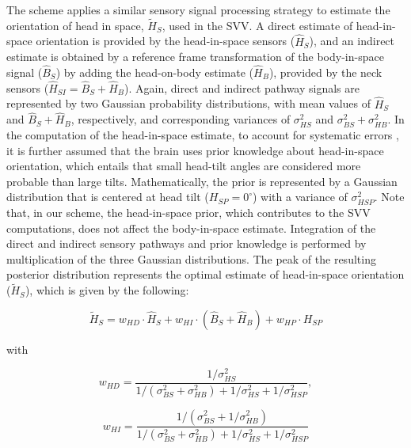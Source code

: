 The scheme applies a similar sensory signal processing strategy to estimate the orientation of head in space, $\tilde{H}_S$, used in the SVV. A direct estimate of head-in-space orientation is provided by the head-in-space sensors ($\hat{H}_S$), and an indirect estimate is obtained by a reference frame transformation of the body-in-space signal ($\hat{B}_S$) by adding the head-on-body estimate ($\hat{H}_B$), provided by the neck sensors ($\hat{H}_{SI} = \hat{B}_S + \hat{H}_B$). Again, direct and indirect pathway signals are represented by two Gaussian probability distributions, with mean values of $\hat{H}_S$ and $\hat{B}_S + \hat{H}_B$, respectively, and corresponding variances of $\sigma^2_{HS}$ and $\sigma^2_{BS} + \sigma^2_{HB}$. In the computation of the head-in-space estimate, to account for systematic errors \cite{macneilage2007, devrijer2008}, it is further assumed that the brain uses prior knowledge about head-in-space orientation, which entails that small head-tilt angles are considered more probable than large tilts. Mathematically, the prior is represented by a Gaussian distribution that is centered at  head tilt ($H_{SP} = 0^\circ$) with a variance of $\sigma^2_{HSP}$. Note that, in our scheme, the head-in-space prior, which contributes to the SVV computations, does not affect the body-in-space estimate. Integration of the direct and indirect sensory pathways and prior knowledge is performed by multiplication of the three Gaussian distributions. The peak of the resulting posterior distribution represents the optimal estimate of head-in-space orientation ($\tilde{H}_S$), which is given by the following: 

\begin{equation}
\label{p1:eqn6}
\tilde{H}_S = w_{HD} \cdot \hat{H}_S + w_{HI} \cdot (\hat{B}_S + \hat{H}_B) + w_{HP} \cdot H_{SP}
\end{equation}

with

\begin{equation}
\label{p1:eqn7}
w_{HD} = \frac{1 / \sigma^2_{HS}}{1 / (\sigma^2_{BS} + \sigma^2_{HB}) + 1/\sigma^2_{HS} + 1/\sigma^2_{HSP}},
\end{equation}

\begin{equation}
\label{p1:eqn8}
w_{HI} = \frac{1 / (\sigma^2_{BS} + 1/\sigma^2_{HB})}{1 / (\sigma^2_{BS} + \sigma^2_{HB}) + 1/\sigma^2_{HS} + 1/\sigma^2_{HSP}}
\end{equation}

